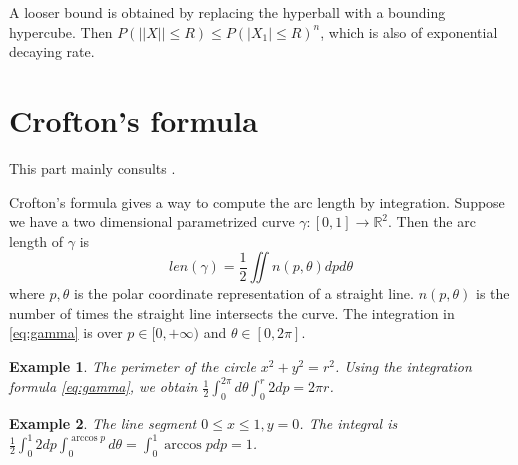 \documentclass{article}
\newtheorem{example}{Example}
\begin{document}
A looser bound is obtained by replacing the hyperball
with a bounding hypercube. Then
$P(||X||\leq R) \leq P(|X_1|\leq R)^n$, which is also of
exponential decaying rate.

\section{Crofton's formula}
This part mainly consults \cite{crofton}.

Crofton's formula gives a way to compute the arc length
by integration. Suppose we have a two dimensional
parametrized curve $\gamma: [0, 1] \to \mathbb{R}^2$.
Then the arc length of $\gamma$ is
\begin{equation}\label{eq:gamma}
    len(\gamma) = \frac{1}{2}\iint n(p, \theta)
    dp d\theta
\end{equation}
where $p, \theta$ is the polar coordinate representation
of a straight line. $n(p, \theta)$ is the number of times the 
straight line intersects the curve. The integration
in \eqref{eq:gamma} is over $p\in [0, +\infty)$
and $\theta \in [0, 2\pi]$.
\begin{example}
    The perimeter of the circle $x^2+y^2=r^2$.
    Using the integration formula \eqref{eq:gamma},
    we obtain $\frac{1}{2}\int_{0}^{2\pi} d\theta \int_0^r 2 dp=2\pi r$.
\end{example}
\begin{example}
    The line segment $0\leq x \leq 1, y=0$.
    The integral is $\frac{1}{2}\int_0^1 2 dp
    \int_0^{\arccos p} d\theta =
    \int_0^1 \arccos p dp=1$.
\end{example}


\end{document}
